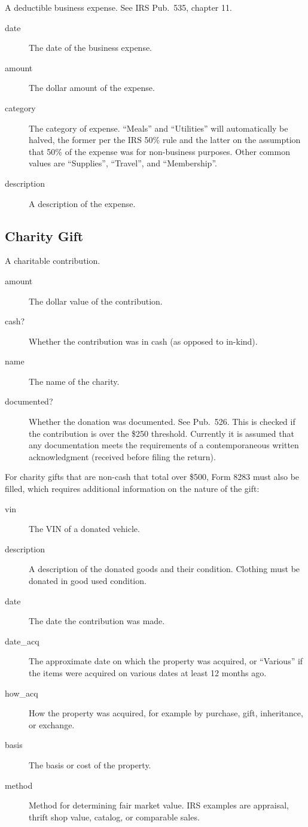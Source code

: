 \documentclass[12pt]{article}
\begin{document}
A deductible business expense. See IRS Pub.~535, chapter 11.

\begin{description}
\item[date] The date of the business expense.
\item[amount] The dollar amount of the expense.
\item[category] The category of expense. ``Meals'' and ``Utilities'' will
automatically be halved, the former per the IRS 50\% rule and the latter on the
assumption that 50\% of the expense was for non-business purposes. Other common
values are ``Supplies'', ``Travel'', and ``Membership''.
\item[description] A description of the expense.
\end{description}


\subsection{Charity Gift}

A charitable contribution.

\begin{description}
\item[amount] The dollar value of the contribution.
\item[cash?] Whether the contribution was in cash (as opposed to in-kind).
\item[name] The name of the charity.
\item[documented?] Whether the donation was documented. See Pub.\ 526. This is
checked if the contribution is over the \$250 threshold. Currently it is assumed
that any documentation meets the requirements of a contemporaneous written
acknowledgment (received before filing the return).
\end{description}
For charity gifts that are non-cash that total over \$500, Form 8283 must also
be filled, which requires additional information on the nature of the gift:
\begin{description}
\item[vin] The VIN of a donated vehicle.
\item[description] A description of the donated goods and their condition.
Clothing must be donated in good used condition.
\item[date] The date the contribution was made.
\item[date\_acq] The approximate date on which the property was acquired, or
``Various'' if the items were acquired on various dates at least 12 months ago.
\item[how\_acq] How the property was acquired, for example by purchase, gift,
inheritance, or exchange.
\item[basis] The basis or cost of the property.
\item[method] Method for determining fair market value. IRS examples are
appraisal, thrift shop value, catalog, or comparable sales.
\end{description}
\end{document}
